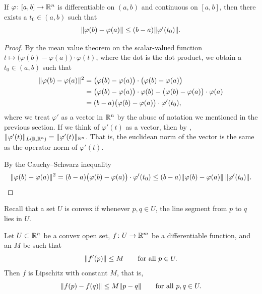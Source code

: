 \begin{lemma} \label{lemma:mvtmv}
If $\varphi \colon [a,b] \to {\mathbb{R}}^n$ is differentiable on $(a,b)$ and
continuous on $[a,b]$, then there exists a $t_0 \in (a,b)$ such that
\begin{equation*}
\lVert {\varphi(b)-\varphi(a)} \rVert \leq (b-a) \lVert {\varphi'(t_0)} \rVert .
\end{equation*}
\end{lemma}

\begin{proof}
By the mean value theorem on the scalar-valued function
$t \mapsto \bigl(\varphi(b)-\varphi(a) \bigr) \cdot \varphi(t)$,
where the dot is the dot product, we obtain
a $t_0 \in (a,b)$ such that
\begin{equation*}
\begin{split}
\lVert {\varphi(b)-\varphi(a)} \rVert^2
& =
\bigl( \varphi(b)-\varphi(a) \bigr)
\cdot
\bigl( \varphi(b)-\varphi(a) \bigr)
\\
& =
\bigl(\varphi(b)-\varphi(a) \bigr) \cdot \varphi(b) - 
\bigl(\varphi(b)-\varphi(a) \bigr) \cdot \varphi(a)
\\
& = 
(b-a)
\bigl(\varphi(b)-\varphi(a) \bigr) \cdot \varphi'(t_0) ,
\end{split}
\end{equation*}
where we treat $\varphi'$ as a vector in ${\mathbb{R}}^n$ by the abuse of
notation we mentioned in the previous section.
If we think of $\varphi'(t)$ as a vector, then by
,
$\lVert {\varphi'(t)} \rVert_{L({\mathbb{R}},{\mathbb{R}}^n)} = \lVert {\varphi'(t)} \rVert_{{\mathbb{R}}^n}$.
That is, the euclidean norm of the vector is the same as the operator norm
of $\varphi'(t)$.

By the Cauchy--Schwarz inequality
\begin{equation*}
\lVert {\varphi(b)-\varphi(a)} \rVert^2
=
(b-a)\bigl(\varphi(b)-\varphi(a) \bigr) \cdot \varphi'(t_0)
\leq
(b-a)
\lVert {\varphi(b)-\varphi(a)} \rVert \, \lVert {\varphi'(t_0)} \rVert . \qedhere
\end{equation*}
\end{proof}

Recall that a set $U$ is convex
if whenever $p,q \in U$, the line segment from
$p$ to $q$ lies in $U$.

\begin{prop} \label{mv:prop:convexlip}
Let $U \subset {\mathbb{R}}^n$ be a convex open set, $f \colon U \to {\mathbb{R}}^m$
be a differentiable function, and an $M$ be such that
\begin{equation*}
\lVert {f'(p)} \rVert \leq M
\qquad \text{for all } p \in U.
\end{equation*}
Then $f$ is Lipschitz with constant $M$, that is,
\begin{equation*}
\lVert {f(p)-f(q)} \rVert \leq M \lVert {p-q} \rVert
\qquad
\text{for all } p,q \in U.
\end{equation*}
\end{prop}

